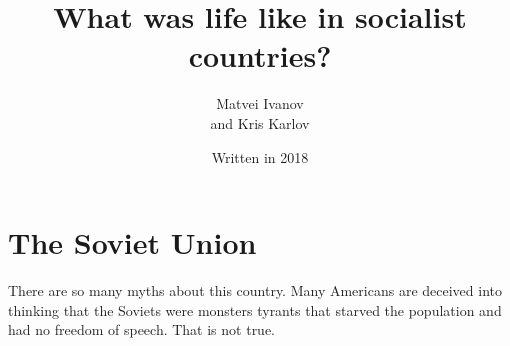 \documentclass[a4paper]{book}%
\begin{document}
\fontsize{24}{28}\selectfont
\title{What was life like in socialist countries?}
\author{Matvei Ivanov \\ and Kris Karlov}
\date{Written in 2018}
\maketitle
\fontsize{24}{28}\selectfont
\chapter{The Soviet Union}
There are so many myths about this country. Many Americans are deceived into thinking that the Soviets were monsters tyrants that starved the population and had no freedom of speech. That is not true.
\end{document}
